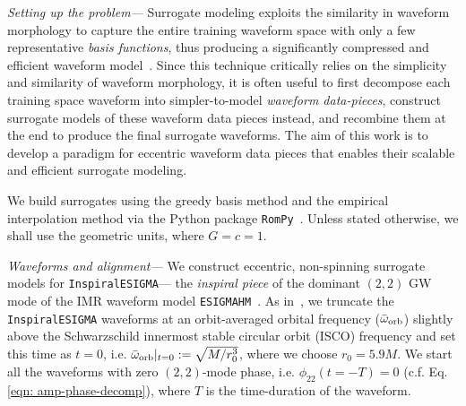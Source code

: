 \documentclass[reprint, superscriptaddress, amsmath, amssymb, aps, prl floatfix]{revtex4-2}
\newcommand{\esigmahm}{\texttt{ESIGMAHM}}
\newcommand{\inspiralesigma}{\texttt{InspiralESIGMA}}
\begin{document}

\textit{Setting up the problem---} 
Surrogate modeling exploits the similarity in waveform morphology to capture the entire training waveform space with only a few representative \textit{basis functions}, thus producing a significantly compressed and efficient waveform model~\citep{Field:2013cfa}. Since this technique critically relies on the simplicity and similarity of waveform morphology, it is often useful to first decompose each training space waveform into simpler-to-model \textit{waveform data-pieces}, construct surrogate models of these waveform data pieces instead, and recombine them at the end to produce the final surrogate waveforms. The aim of this work is to develop a paradigm for eccentric waveform data pieces that enables their scalable and efficient surrogate modeling.

We build surrogates using the greedy basis method and the empirical interpolation method via the Python package \texttt{RomPy}~\citep{rompy, Field:2013cfa}.
Unless stated otherwise, we shall use the geometric units, where $G=c=1$.


\textit{Waveforms and alignment---}
We construct eccentric, non-spinning surrogate models for \inspiralesigma{}--- the \textit{inspiral piece} of the dominant $(2,2)$ GW mode of the IMR waveform model \esigmahm{}~\citep{Paul:2024ujx, esigmapy}.
As in~\citep{Paul:2024ujx}, we truncate the \inspiralesigma{} waveforms at an orbit-averaged orbital frequency ($\bar{\omega}_{\rm{orb}}$) slightly above the Schwarzschild innermost stable circular orbit (ISCO) frequency and set this time as $t=0$, i.e. $\bar{\omega}_{\rm{orb}} |_{t=0} := \sqrt{M/r_0^{3}}$, where we choose $r_0 = 5.9M$.
We start all the waveforms with zero $(2,2)$-mode phase, i.e. $\phi_{22}(t=-T) = 0$ (c.f. Eq. \eqref{eqn: amp-phase-decomp}), where $T$ is the time-duration of the waveform.  

\end{document}
